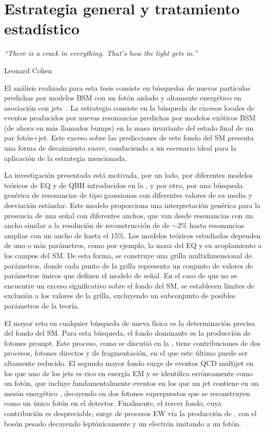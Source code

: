\chapter{Estrategia general y tratamiento estadístico}
\label{ch:strategy}
\epigraph{\emph{``There is a crack in everything. That's how the light gets in.”}}{Leonard Cohen}





El análisis realizado para esta tesis consiste en búsquedas de nuevas partículas predichas por modelos \ac{BSM} con un fotón aislado y altamente energético en asociación con jets~\cite{ATLAS-PhotonJetResonances-Run2-NOTE}. La estrategia consiste en la búsqueda de excesos locales de eventos producidos por nuevas resonancias predichas por modelos exóticos \ac{BSM} (de ahora en más llamados bumps) en la masa invariante del estado final de un par fotón+jet. Este exceso sobre las predicciones de este fondo del \ac{SM} presenta una forma de decaimiento suave, conduciendo a un escenario ideal para la aplicación de la estrategia mencionada.

La investigación presentada está motivada, por un lado, por diferentes modelos teóricos de \acf{EQ} y de \acf{QBH} introducidos en la \Sect{\ref{sec:theory:bsm}}, y por otro, por una búsqueda genérica de resonancias de tipo gaussianas con diferentes valores de su media y desviación estándar. Este modelo proporciona una interpretación genérica para la presencia de una señal con diferentes anchos, que van desde resonancias con un ancho similar a la resolución de reconstrucción de \myj de \(\sim 2\%\) hasta resonancias amplias con un ancho de hasta el \(15\%\).
Los modelos teóricos estudiados dependen de uno o más parámetros, como por ejemplo, la masa del \ac{EQ} y su acoplamiento a los campos del \ac{SM}. De esta forma, se construye una grilla multidimensional de parámetros, donde cada punto de la grilla representa un conjunto de valores de parámetros únicos que definen el modelo de señal. En el caso de que no se encuentre un exceso significativo sobre el fondo del \ac{SM}, se establecen límites de exclusión a los valores de la grilla, excluyendo un subconjunto de posibles parámetros de la teoría.


El mayor reto en cualquier búsqueda de nueva física es la determinación precisa del fondo del \ac{SM}. Para esta búsqueda, el fondo dominante es la producción de fotones prompt. Este proceso, como se discutió en la \Sect{\ref{subsec:theory:sm:prompt_photon}}, tiene contribuciones de dos procesos, fotones directos y de fragmentación, en el que este último puede ser altamente reducido. El segundo mayor fondo surge de eventos \ac{QCD} multijet en los que uno de los jets es rico en energía \ac{EM} y se identifica erróneamente como un fotón, que incluye fundamentalmente eventos en los que un jet contiene en un mesón energético \pizero, decayendo en dos fotones superpuestos que se reconstruyen como un único fotón en el detector. Finalmente, el tercer fondo, cuya contribución es despreciable, surge de procesos \ac{EW} vía la producción de \WZjet, con el bosón pesado decayendo leptónicamente y un electrón imitando a un fotón.


